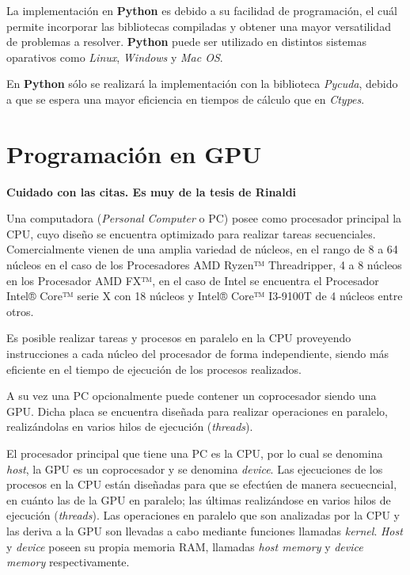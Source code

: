 La implementación en \textbf{Python} es debido a su facilidad de programación, el cuál permite incorporar las bibliotecas compiladas y obtener una mayor versatilidad de problemas a resolver. \textbf{Python} puede ser utilizado en distintos sistemas oparativos como \textit{Linux}, \textit{Windows} y \textit{Mac OS}. 

En \textbf{Python} sólo se realizará la implementación con la biblioteca \textit{Pycuda}, debido a que se espera una mayor eficiencia en tiempos de cálculo que en \textit{Ctypes}.




\section{Programación en GPU}




\textbf{Cuidado con las citas. Es muy de la tesis de Rinaldi}


Una computadora (\textit{Personal Computer} o PC) posee como procesador principal la CPU, cuyo diseño se encuentra optimizado para realizar tareas secuenciales. Comercialmente vienen de una amplia variedad de núcleos, en el rango de 8 a 64 núcleos en el caso de los Procesadores AMD Ryzen™ Threadripper, 4 a 8 núcleos en los Procesador AMD FX™, en el caso de Intel se encuentra el Procesador Intel® Core™ serie X con 18 núcleos y  Intel® Core™ I3-9100T de 4 núcleos entre otros. \cite{edp:2020:amd} \cite{icp:2020:intel}

Es posible realizar tareas y procesos en paralelo en la CPU proveyendo instrucciones a cada núcleo del procesador de forma independiente, siendo más eficiente en el tiempo de ejecución de los procesos realizados.

A su vez una PC opcionalmente puede contener un coprocesador siendo una GPU. Dicha placa se encuentra diseñada para realizar operaciones en paralelo, realizándolas en varios hilos de ejecución (\textit{threads}).




El procesador principal que tiene una PC es la CPU, por lo cual se denomina \textit{host}, la GPU es un coprocesador y se denomina \textit{device}. Las ejecuciones de los procesos en la CPU están diseñadas para que se efectúen de manera secuecncial, en cuánto las de la GPU en paralelo; las últimas realizándose en varios hilos de ejecución (\textit{threads}). Las operaciones en paralelo que son analizadas por la CPU y las deriva a la GPU son llevadas a cabo mediante funciones llamadas \textit{kernel}. \textit{Host} y \textit{device} poseen su propia memoria RAM, llamadas \textit{host memory} y \textit{device memory} respectivamente. \cite{rinaldi2011modelos}

